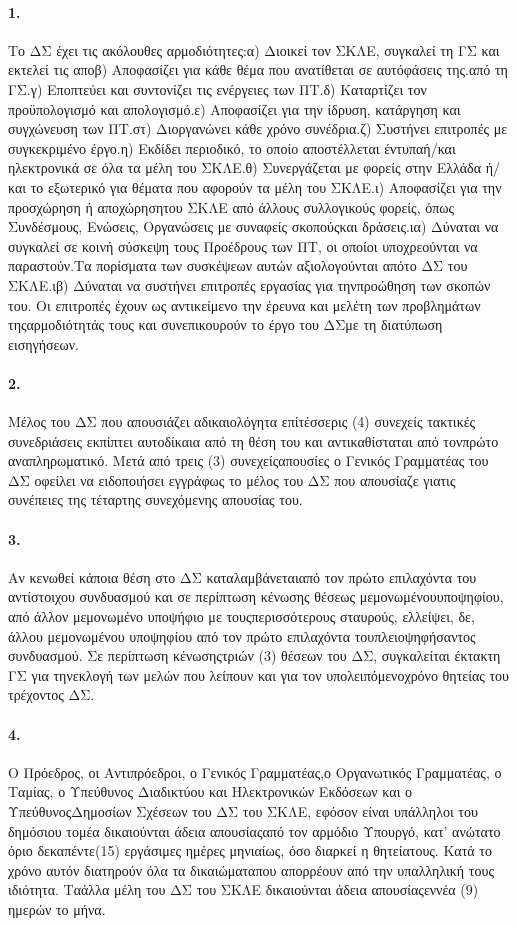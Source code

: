 \documentclass[a4paper,oneside, 10pt]{book}
\begin{document}
\paragraph { 1. } Το ΔΣ έχει τις ακόλουθες αρμοδιότητες:α) Διοικεί τον ΣΚΛΕ, συγκαλεί τη ΓΣ και εκτελεί τις αποβ) Αποφασίζει για κάθε θέμα που ανατίθεται σε αυτόφάσεις της.από τη ΓΣ.γ) Εποπτεύει και συντονίζει τις ενέργειες των ΠΤ.δ) Καταρτίζει τον προϋπολογισμό και απολογισμό.ε) Αποφασίζει για την ίδρυση, κατάργηση και συγχώνευση των ΠΤ.στ) Διοργανώνει κάθε χρόνο συνέδρια.ζ) Συστήνει επιτροπές με συγκεκριμένο έργο.η) Εκδίδει περιοδικό, το οποίο αποστέλλεται έντυπαή/και ηλεκτρονικά σε όλα τα μέλη του ΣΚΛΕ.θ) Συνεργάζεται με φορείς στην Ελλάδα ή/και το εξωτερικό για θέματα που αφορούν τα μέλη του ΣΚΛΕ.ι) Αποφασίζει για την προσχώρηση ή αποχώρησητου ΣΚΛΕ από άλλους συλλογικούς φορείς, όπως Συνδέσμους, Ενώσεις, Οργανώσεις με συναφείς σκοπούςκαι δράσεις.ια) Δύναται να συγκαλεί σε κοινή σύσκεψη τους Προέδρους των ΠΤ, οι οποίοι υποχρεούνται να παραστούν.Τα πορίσματα των συσκέψεων αυτών αξιολογούνται απότο ΔΣ του ΣΚΛΕ.ιβ) Δύναται να συστήνει επιτροπές εργασίας για τηνπροώθηση των σκοπών του. Οι επιτροπές έχουν ως αντικείμενο την έρευνα και μελέτη των προβλημάτων τηςαρμοδιότητάς τους και συνεπικουρούν το έργο του ΔΣμε τη διατύπωση εισηγήσεων.
\paragraph { 2. } Μέλος του ΔΣ που απουσιάζει αδικαιολόγητα επίτέσσερις (4) συνεχείς τακτικές συνεδριάσεις εκπίπτει αυτοδίκαια από τη θέση του και αντικαθίσταται από τονπρώτο αναπληρωματικό. Μετά από τρεις (3) συνεχείςαπουσίες ο Γενικός Γραμματέας του ΔΣ οφείλει να ειδοποιήσει εγγράφως το μέλος του ΔΣ που απουσίαζε γιατις συνέπειες της τέταρτης συνεχόμενης απουσίας του.
\paragraph { 3. } Αν κενωθεί κάποια θέση στο ΔΣ καταλαμβάνεταιαπό τον πρώτο επιλαχόντα του αντίστοιχου συνδυασμού και σε περίπτωση κένωσης θέσεως μεμονωμένουυποψηφίου, από άλλον μεμονωμένο υποψήφιο με τουςπερισσότερους σταυρούς, ελλείψει, δε, άλλου μεμονωμένου υποψηφίου από τον πρώτο επιλαχόντα τουπλειοψηφήσαντος συνδυασμού. Σε περίπτωση κένωσηςτριών (3) θέσεων του ΔΣ, συγκαλείται έκτακτη ΓΣ για τηνεκλογή των μελών που λείπουν και για τον υπολειπόμενοχρόνο θητείας του τρέχοντος ΔΣ.
\paragraph { 4. } Ο Πρόεδρος, οι Αντιπρόεδροι, ο Γενικός Γραμματέας,ο Οργανωτικός Γραμματέας, ο Ταμίας, ο Υπεύθυνος Διαδικτύου και Ηλεκτρονικών Εκδόσεων και ο ΥπεύθυνοςΔημοσίων Σχέσεων του ΔΣ του ΣΚΛΕ, εφόσον είναι υπάλληλοι του δημόσιου τομέα δικαιούνται άδεια απουσίαςαπό τον αρμόδιο Υπουργό, κατ’ ανώτατο όριο δεκαπέντε(15) εργάσιμες ημέρες μηνιαίως, όσο διαρκεί η θητείατους. Κατά το χρόνο αυτόν διατηρούν όλα τα δικαιώματαπου απορρέουν από την υπαλληλική τους ιδιότητα. Ταάλλα μέλη του ΔΣ του ΣΚΛΕ δικαιούνται άδεια απουσίαςεννέα (9) ημερών το μήνα.
\end{document}
